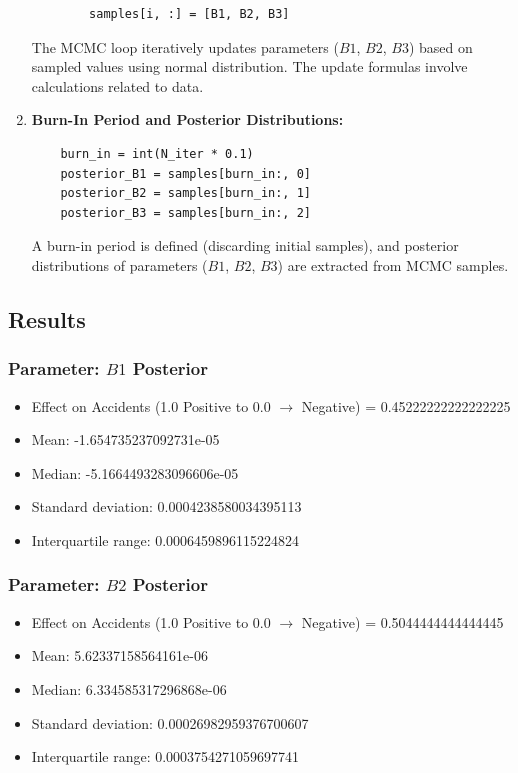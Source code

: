 \documentclass{article}
\begin{document}
\begin{enumerate}[label=\arabic*.]
\begin{lstlisting}
        samples[i, :] = [B1, B2, B3]
    \end{lstlisting}

    The MCMC loop iteratively updates parameters (\(B1\), \(B2\), \(B3\)) based on sampled values using normal distribution. The update formulas involve calculations related to data.

    \item \textbf{Burn-In Period and Posterior Distributions:}
    \begin{lstlisting}
    burn_in = int(N_iter * 0.1)
    posterior_B1 = samples[burn_in:, 0]
    posterior_B2 = samples[burn_in:, 1]
    posterior_B3 = samples[burn_in:, 2]
    \end{lstlisting}

    A burn-in period is defined (discarding initial samples), and posterior distributions of parameters (\(B1\), \(B2\), \(B3\)) are extracted from MCMC samples.

\end{enumerate}


\subsection{Results}

\subsubsection*{Parameter: \(B1\) Posterior}
\begin{itemize}
    \item Effect on Accidents (1.0 Positive to 0.0 $\rightarrow$ Negative) = 0.45222222222222225
    \item Mean: -1.654735237092731e-05
    \item Median: -5.1664493283096606e-05
    \item Standard deviation: 0.0004238580034395113
    \item Interquartile range: 0.0006459896115224824
\end{itemize}

\subsubsection*{Parameter: \(B2\) Posterior}
\begin{itemize}
    \item Effect on Accidents (1.0 Positive to 0.0 $\rightarrow$ Negative) = 0.5044444444444445
    \item Mean: 5.62337158564161e-06
    \item Median: 6.334585317296868e-06
    \item Standard deviation: 0.00026982959376700607
    \item Interquartile range: 0.0003754271059697741
\end{itemize}
\end{document}
